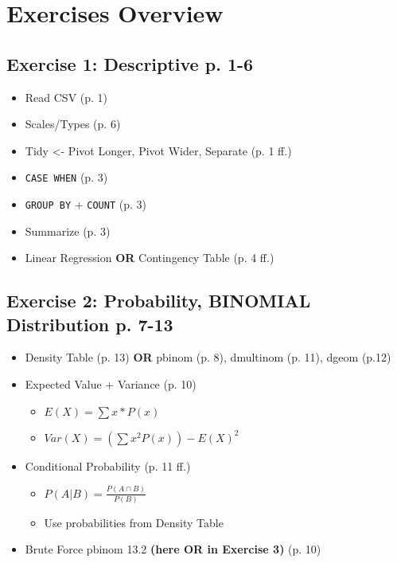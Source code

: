 \section*{Exercises Overview}

\subsection*{Exercise 1: Descriptive p. 1-6}
\begin{itemize}
    \item Read CSV (p. 1)
    \item Scales/Types (p. 6)
    \item Tidy <- Pivot Longer, Pivot Wider, Separate (p. 1 ff.)
    \item \texttt{CASE WHEN} (p. 3)
    \item \texttt{GROUP BY} + \texttt{COUNT} (p. 3)
    \item Summarize (p. 3)
    \item Linear Regression \textbf{OR} Contingency Table (p. 4 ff.)
\end{itemize}

\subsection*{Exercise 2: Probability, BINOMIAL Distribution p. 7-13}
\begin{itemize}
    \item Density Table (p. 13) \textbf{OR} pbinom (p. 8), dmultinom (p. 11),  dgeom (p.12)
    \item Expected Value + Variance (p. 10)
          \begin{itemize}
              \item $E(X) = \sum x * P(x)$
              \item $Var(X) = (\sum x^2 P(x)) - E(X)^2$
          \end{itemize}
    \item Conditional Probability (p. 11 ff.)
          \begin{itemize}
              \item $P(A|B) = \frac{P(A \cap B)}{P(B)}$
              \item Use probabilities from Density Table
          \end{itemize}
    \item Brute Force pbinom 13.2 \textbf{(here OR in Exercise 3)} (p. 10)
\end{itemize}


